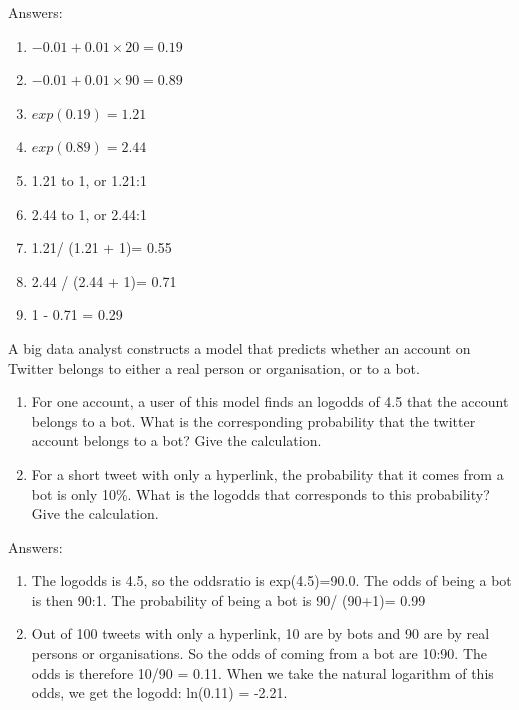 \documentclass[]{book}\usepackage[]{graphicx}\usepackage[]{color}
\begin{document}
Answers:

\begin{enumerate}

\item
$-0.01 + 0.01 \times 20 = 0.19$

\item
$-0.01 + 0.01 \times 90 = 0.89$

\item
$exp(0.19)=1.21$

\item
$exp(0.89)=2.44$

\item
1.21 to 1, or 1.21:1

\item
2.44 to 1, or 2.44:1

\item
1.21/ (1.21 + 1)= 0.55

\item
2.44 / (2.44 + 1)= 0.71

\item
1 - 0.71 = 0.29


\end{enumerate}


A big data analyst constructs a model that predicts whether an account on Twitter belongs to either a real person or organisation, or to a bot.

\begin{enumerate}

\item
For one account, a user of this model finds an logodds of 4.5 that the account belongs to a bot. What is the corresponding probability that the twitter account belongs to a bot? Give the calculation.

\item
For a short tweet with only a hyperlink, the probability that it comes from a bot is only 10\%. What is the logodds that corresponds to this probability? Give the calculation.


\end{enumerate}



Answers:
\begin{enumerate}

\item The logodds is 4.5, so the oddsratio is exp(4.5)=90.0.
The odds of being a bot is then 90:1.
The probability of being a bot is 90/ (90+1)= 0.99

\item
Out of 100 tweets with only a hyperlink, 10 are by bots and 90 are by real persons or organisations. So the odds of coming from a bot are 10:90. The odds is therefore 10/90 = 0.11. When we take the natural logarithm of this odds, we get the logodd: ln(0.11) = -2.21.

\end{enumerate}
\end{document}
